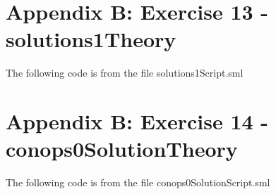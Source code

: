 \documentclass{report}
\begin{document}
\chapter{Appendix B: Exercise 13 - solutions1Theory }
\label{cha:appendix-a:chapter13b}

The following code is from the file solutions1Script.sml


\chapter{Appendix B: Exercise 14 - conops0SolutionTheory}
\label{cha:appendix-a:chapter13b}

The following code is from the file conops0SolutionScript.sml

\end{document}
